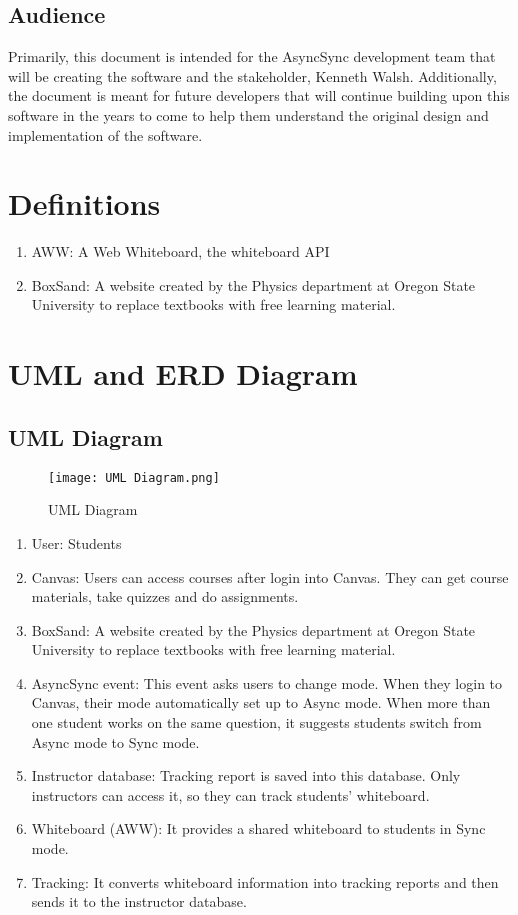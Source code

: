 \documentclass[onecolumn, draftclsnofoot,10pt, compsoc]{IEEEtran}
\begin{document}
	\subsection{Audience}

	Primarily, this document is intended for the AsyncSync development team that will be creating the software and the stakeholder, Kenneth Walsh. Additionally, the document is meant for future developers that will continue building upon this software in the years to come to help them understand the original design and implementation of the software.


\section{Definitions}

	\begin{enumerate}
		\item AWW: A Web Whiteboard, the whiteboard API
		\item BoxSand: A website created by the Physics department at Oregon State University to replace textbooks with free learning material.
	\end{enumerate}

\section{UML and ERD Diagram}
	\subsection{UML Diagram}

		\begin{figure}[H]
			\begin{center}
				\caption{UML Diagram}
				\texttt{[image: UML Diagram.png]}
			\end{center}
		\end{figure}

		\begin{enumerate}
			\item
			User: Students
			\item
			Canvas: Users can access courses after login into Canvas. They can get course materials, take quizzes and do assignments.
			\item
			BoxSand: A website created by the Physics department at Oregon State University to replace textbooks with free learning material.
			\item
			AsyncSync event: This event asks users to change mode. When they login to Canvas, their mode automatically set up to Async mode. When more than one student works on the same question, it suggests students switch from Async mode to Sync mode.
			\item
			Instructor database: Tracking report is saved into this database. Only instructors can access it, so they can track students’ whiteboard.
			\item
			Whiteboard (AWW): It provides a shared whiteboard to students in Sync mode.
			\item
			Tracking: It converts whiteboard information into tracking reports and then sends it to the instructor database.
		\end{enumerate}
\end{document}
